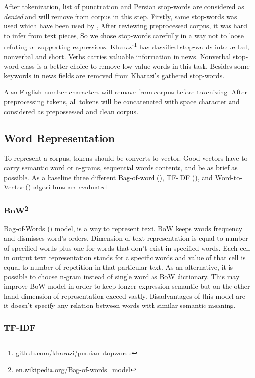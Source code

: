 After tokenization, list of punctuation and Persian stop-words are considered as \textit{denied} and will remove from corpus in this step. Firstly, same stop-words was used which have been used by \cite{stance_persian}, After reviewing preprocessed corpus, it was hard to infer from text pieces, So we chose stop-words carefully in a way not to loose refuting or supporting expressions. Kharazi\footnote{\label{fn:kharazi}github.com/kharazi/persian-stopwords} has classified stop-words into verbal, nonverbal and short. Verbs carries valuable information in news. Nonverbal stop-word class is a better choice to remove low value words in this task. Besides some keywords in news fields are removed from Kharazi's gathered stop-words. 

Also English number characters will remove from corpus before tokenizing. After preprocessing tokens, all tokens will be concatenated with space character and considered as prepossessed and clean corpus.


\subsection{Word Representation}
To represent a corpus, tokens should be converts to vector. Good vectors have to carry semantic word or n-grams, sequential words contents, and be as brief as possible. As a baseline three different Bag-of-word (\cite{bow}), TF-iDF (\cite{tfidf}), and Word-to-Vector (\cite{word2vec}) algorithms are evaluated. 

\subsubsection{BoW\protect\footnote{en.wikipedia.org/Bag-of-words\_model}}
Bag-of-Words (\cite{bow}) model, is a way to represent text. BoW keeps words frequency and
dismisses word's orders. Dimension of text representation is equal to number of specified words plus one for words that don't exist in specified words. Each cell in output text representation stands for a specific words and value of that cell is equal to number of repetition in that particular text. As an alternative, it is possible to choose n-gram instead of single word as BoW dictionary. This may improve BoW model in order to keep longer expression semantic but on the other hand dimension of representation exceed vastly. Disadvantages of this model are it doesn't specify any relation between words with similar semantic meaning. 

\subsubsection{TF-IDF}

